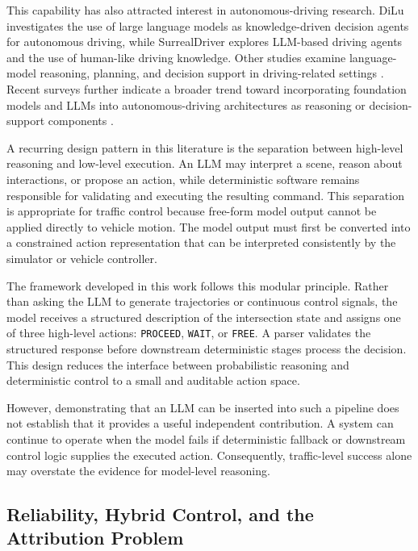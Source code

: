 \documentclass[letterpaper,10pt,conference]{ieeeconf}
\begin{document}
This capability has also attracted interest in autonomous-driving research. DiLu \cite{Wen2023} investigates the use of large language models as knowledge-driven decision agents for autonomous driving, while SurrealDriver \cite{Jin2023} explores LLM-based driving agents and the use of human-like driving knowledge. Other studies examine language-model reasoning, planning, and decision support in driving-related settings \cite{Cui2024,Yang2024,Hou2025}. Recent surveys further indicate a broader trend toward incorporating foundation models and LLMs into autonomous-driving architectures as reasoning or decision-support components \cite{Yang2024,Li2024}.



A recurring design pattern in this literature is the separation between high-level reasoning and low-level execution. An LLM may interpret a scene, reason about interactions, or propose an action, while deterministic software remains responsible for validating and executing the resulting command. This separation is appropriate for traffic control because free-form model output cannot be applied directly to vehicle motion. The model output must first be converted into a constrained action representation that can be interpreted consistently by the simulator or vehicle controller.



The framework developed in this work follows this modular principle. Rather than asking the LLM to generate trajectories or continuous control signals, the model receives a structured description of the intersection state and assigns one of three high-level actions: \texttt{PROCEED}, \texttt{WAIT}, or \texttt{FREE}. A parser validates the structured response before downstream deterministic stages process the decision. This design reduces the interface between probabilistic reasoning and deterministic control to a small and auditable action space.



However, demonstrating that an LLM can be inserted into such a pipeline does not establish that it provides a useful independent contribution. A system can continue to operate when the model fails if deterministic fallback or downstream control logic supplies the executed action. Consequently, traffic-level success alone may overstate the evidence for model-level reasoning.



\subsection{Reliability, Hybrid Control, and the Attribution Problem}
\end{document}
